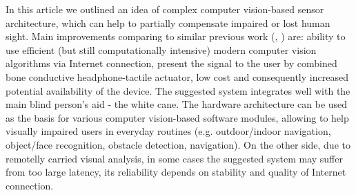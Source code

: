 \documentclass[10pt,conference,compsocconf]{IEEEtran}
\begin{document}
In this article we outlined an idea of complex computer vision-based sensor architecture, which can help to partially compensate impaired or lost human sight. Main improvements comparing to similar previous work (\cite{?}, \cite{?}) are: ability to use efficient (but still computationally intensive) modern computer vision algorithms via Internet connection, present the signal to the user by combined bone conductive headphone-tactile actuator, low cost and consequently increased potential availability of the device. The suggested system integrates well with the main blind person's aid - the white cane. The hardware architecture can be used as the basis for various computer vision-based software modules, allowing to help visually impaired users in everyday routines (e.g. outdoor/indoor navigation, object/face recognition, obstacle detection, navigation). On the other side, due to remotelly carried visual analysis, in some cases the suggested system may suffer from too large latency, its reliability depends on stability and quality of Internet connection. 













\end{document}
